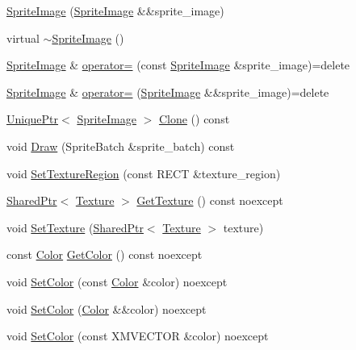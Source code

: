 \begin{DoxyCompactItemize}
\item 
\hyperlink{classmage_1_1_sprite_image_ae1ea5c900498c8ecdf5dd3131d056dd5}{Sprite\+Image} (\hyperlink{classmage_1_1_sprite_image}{Sprite\+Image} \&\&sprite\+\_\+image)
\item 
virtual \hyperlink{classmage_1_1_sprite_image_a9121ee110f7e64ee6e936e0d3350ab44}{$\sim$\+Sprite\+Image} ()
\item 
\hyperlink{classmage_1_1_sprite_image}{Sprite\+Image} \& \hyperlink{classmage_1_1_sprite_image_a20d8e8272cf62599f6c0e4b1ff4f3586}{operator=} (const \hyperlink{classmage_1_1_sprite_image}{Sprite\+Image} \&sprite\+\_\+image)=delete
\item 
\hyperlink{classmage_1_1_sprite_image}{Sprite\+Image} \& \hyperlink{classmage_1_1_sprite_image_a9f83e728a93550f6b20bb4d500483171}{operator=} (\hyperlink{classmage_1_1_sprite_image}{Sprite\+Image} \&\&sprite\+\_\+image)=delete
\item 
\hyperlink{namespacemage_a3316d7143a973e37adf1110f2e80ca31}{Unique\+Ptr}$<$ \hyperlink{classmage_1_1_sprite_image}{Sprite\+Image} $>$ \hyperlink{classmage_1_1_sprite_image_a19db9a2a418dd04db0b38d1f8aa7e035}{Clone} () const
\item 
void \hyperlink{classmage_1_1_sprite_image_ae30d3293931f674fea17008063755bb6}{Draw} (Sprite\+Batch \&sprite\+\_\+batch) const
\item 
void \hyperlink{classmage_1_1_sprite_image_a99640fe6fc85d704f6a2831d0f663033}{Set\+Texture\+Region} (const R\+E\+CT \&texture\+\_\+region)
\item 
\hyperlink{namespacemage_a1e01ae66713838a7a67d30e44c67703e}{Shared\+Ptr}$<$ \hyperlink{classmage_1_1_texture}{Texture} $>$ \hyperlink{classmage_1_1_sprite_image_af0702a186685d80bab77c23643be1674}{Get\+Texture} () const noexcept
\item 
void \hyperlink{classmage_1_1_sprite_image_a12e0ffecc7995f13ccf0374fa37dc4c6}{Set\+Texture} (\hyperlink{namespacemage_a1e01ae66713838a7a67d30e44c67703e}{Shared\+Ptr}$<$ \hyperlink{classmage_1_1_texture}{Texture} $>$ texture)
\item 
const \hyperlink{structmage_1_1_color}{Color} \hyperlink{classmage_1_1_sprite_image_aa04711b85cbe98493edd8767ac3348b5}{Get\+Color} () const noexcept
\item 
void \hyperlink{classmage_1_1_sprite_image_ac061b1e201e24097d4b667b8fb53c232}{Set\+Color} (const \hyperlink{structmage_1_1_color}{Color} \&color) noexcept
\item 
void \hyperlink{classmage_1_1_sprite_image_a27b191565b90ee8fe78b7db3be0c9bb2}{Set\+Color} (\hyperlink{structmage_1_1_color}{Color} \&\&color) noexcept
\item 
void \hyperlink{classmage_1_1_sprite_image_a4ee2d13c618ef1c16e4cee8433f3d5dd}{Set\+Color} (const X\+M\+V\+E\+C\+T\+OR \&color) noexcept
\end{DoxyCompactItemize}
